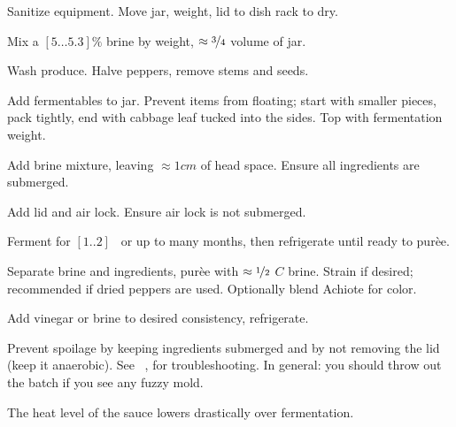 \begin{preparation}
\item Sanitize equipment.
	Move jar, weight, lid to dish rack to dry.

\item Mix a $[5 \dots 5.3]\%$ brine by weight, $\approx\nicefrac{3}{4}$ volume of jar.

\item Wash produce.
	Halve peppers, remove stems and seeds.

\item Add fermentables to jar.
	Prevent items from floating; start with smaller pieces, pack tightly, end with cabbage leaf tucked into the sides.
	Top with fermentation weight.

\item Add brine mixture, leaving $\approx1cm$ of head space.
	Ensure all ingredients are submerged.

\item Add lid and air lock.
	Ensure air lock is not submerged.

\item Ferment for $[1..2]$ \week~or up to many months, then refrigerate until ready to pur\`{e}e.

\item Separate brine and ingredients, pur\`{e}e with $\approx\nicefrac{1}{2}$ $C$ brine.
	Strain if desired; recommended if dried peppers are used.
	Optionally blend Achiote for color.

\item Add vinegar or brine to desired consistency, refrigerate.
\end{preparation}


\begin{experiments}
\item Prevent spoilage by keeping ingredients submerged and by not removing the lid (keep it anaerobic).
	See ~\cite{fieryferments2017},
for troubleshooting.
	In general: you should throw out the batch if you see any fuzzy mold.
\item The heat level of the sauce lowers drastically over fermentation.
\end{experiments}


\recipeend%

